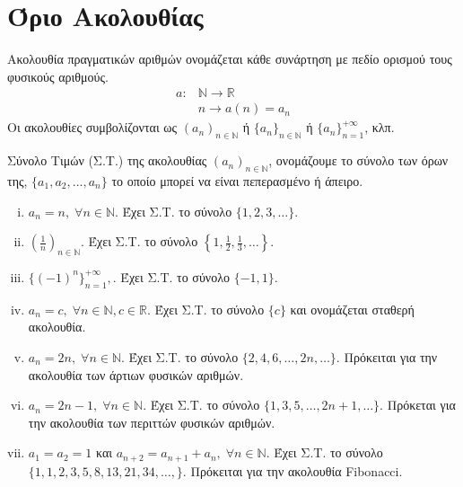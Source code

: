 \documentclass[main.tex]{subfiles}
\begin{document}
\section{Όριο Ακολουθίας}

\begin{dfn}
    Ακολουθία πραγματικών αριθμών ονομάζεται κάθε συνάρτηση με πεδίο ορισμού 
    τους φυσικούς αριθμούς. 
    \begin{align*}
        a \colon &\mathbb{N} \to \mathbb{R} \\
                 &n \to a(n)=a_{n}
     \end{align*} 
     Οι ακολουθίες συμβολίζονται ως $ (a_{n})_{n \in \mathbb{N}} $  
      ή $ \{ a_{n} \} _{n \in \mathbb{N}} $  ή $ \{ a_{n} \} _{n=1}^{+\infty} $, κλπ.
\end{dfn}

\begin{dfn}
    Σύνολο Τιμών (Σ.Τ.) της ακολουθίας $ (a_{n})_{n \in \mathbb{N}} $, ονομάζουμε 
    το σύνολο των όρων της, $ \{ a_{1}, a_{2}, \ldots, a_{n} \} $ το οποίο μπορεί 
    να είναι πεπερασμένο ή άπειρο.
\end{dfn}

\begin{examples}
        \item {}
    \begin{enumerate}[i)]
        \item $ a_{n} = n, \; \forall n \in \mathbb{N} $. Έχει Σ.Τ. το σύνολο 
            $  \{ 1,2,3, \ldots \} $.
        \item $\left(\frac{1}{n}\right)_{n \in \mathbb{N}} $. Έχει Σ.Τ. το σύνολο 
            $  \left\{ 1, \frac{1}{2}, \frac{1}{3}, \ldots \right\} $.
        \item $ \{(-1)^{n}\}_{n=1}^{+ \infty}, $. Έχει Σ.Τ. 
            το σύνολο $ \{ -1,1 \} $.
        \item $ a_{n} = c, \; \forall n \in \mathbb{N}, c \in \mathbb{R} $.
            Έχει Σ.Τ. το σύνολο $ \{ c \} $ και ονομάζεται σταθερή ακολουθία.
        \item $ a_{n}=2n, \; \forall n \in \mathbb{N} $. Έχει Σ.Τ. το σύνολο 
            $ \{ 2,4,6, \ldots, 2n, \ldots \} $. Πρόκειται για την ακολουθία 
            των άρτιων φυσικών αριθμών.
        \item $ a_{n}= 2n-1, \; \forall n \in \mathbb{N} $. Έχει Σ.Τ. το 
            σύνολο $ \{ 1,3,5, \ldots, 2n+1, \ldots \} $. Πρόκεται για την 
            ακολουθία των περιττών φυσικών αριθμών.
        \item \label{ex:anadr} $ a_{1}= a_{2} = 1 $ και $ a_{n+2}=a_{n+1}+a_{n}, \; 
            \forall n \in \mathbb{N}$. Έχει Σ.Τ. το σύνολο $ \{ 1,1,2,3,5,8,
            13,21,34, \ldots,\} $. Πρόκειται για την ακολουθία Fibonacci. 
    \end{enumerate}
\end{examples}
\end{document}
